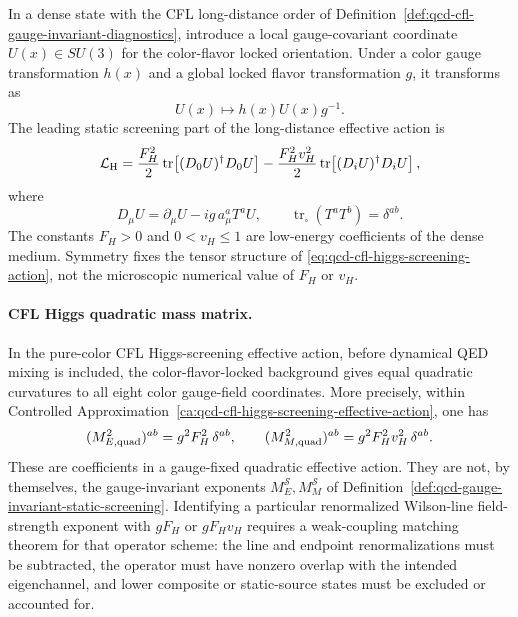 \begin{controlledapproximation}
\label{ca:qcd-cfl-higgs-screening-effective-action}
In a dense state with the CFL long-distance order of
Definition~\ref{def:qcd-cfl-gauge-invariant-diagnostics}, introduce a
local gauge-covariant coordinate \(U(x)\in SU(3)\) for the color-flavor
locked orientation.  Under a color gauge transformation \(h(x)\) and a
global locked flavor transformation \(g\), it transforms as
\[
  U(x)\longmapsto h(x)U(x)g^{-1}.
\]
The leading static screening part of the long-distance effective action is
\begin{equation}
  \mathcal L_{\rm H}
  =
  \frac{F_H^2}{2}
  \operatorname{tr}\!\left[(D_0U)^\dagger D_0U\right]
  -
  \frac{F_H^2v_H^2}{2}
  \operatorname{tr}\!\left[(D_iU)^\dagger D_iU\right],
  \label{eq:qcd-cfl-higgs-screening-action}
\end{equation}
where
\[
  D_\mu U=\partial_\mu U-i g\,a_\mu^aT^aU,
  \qquad
  \operatorname{tr}_{\square}(T^aT^b)=\delta^{ab}.
\]
The constants \(F_H>0\) and \(0<v_H\le1\) are low-energy coefficients of
the dense medium.  Symmetry fixes the tensor structure of
\eqref{eq:qcd-cfl-higgs-screening-action}, not the microscopic numerical
value of \(F_H\) or \(v_H\).
\end{controlledapproximation}

\paragraph{CFL Higgs quadratic mass matrix.}
In the pure-color CFL Higgs-screening effective action, before dynamical QED
mixing is included, the color-flavor-locked background gives equal quadratic
curvatures to all eight color gauge-field coordinates.  More precisely, within
Controlled Approximation~\ref{ca:qcd-cfl-higgs-screening-effective-action},
one has
\begin{equation}
  (M_{E,\rm quad}^2)^{ab}=g^2F_H^2\,\delta^{ab},
  \qquad
  (M_{M,\rm quad}^2)^{ab}=g^2F_H^2v_H^2\,\delta^{ab}.
  \label{eq:qcd-cfl-higgs-screening-masses}
\end{equation}
These are coefficients in a gauge-fixed quadratic effective action.  They are
not, by themselves, the gauge-invariant exponents
\(M_E^{\mathcal S},M_M^{\mathcal S}\) of
Definition~\ref{def:qcd-gauge-invariant-static-screening}.  Identifying a
particular renormalized Wilson-line field-strength exponent with \(gF_H\) or
\(gF_Hv_H\) requires a weak-coupling matching theorem for that operator scheme:
the line and endpoint renormalizations must be subtracted, the operator must
have nonzero overlap with the intended eigenchannel, and lower composite or
static-source states must be excluded or accounted for.

